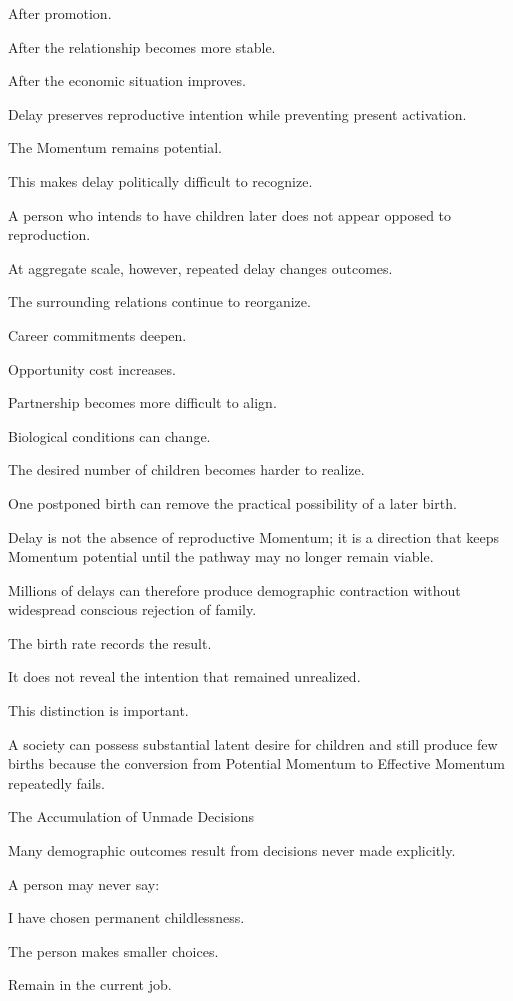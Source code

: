 After promotion.

After the relationship becomes more stable.

After the economic situation improves.

Delay preserves reproductive intention while preventing present activation.

The Momentum remains potential.

This makes delay politically difficult to recognize.

A person who intends to have children later does not appear opposed to reproduction.

At aggregate scale, however, repeated delay changes outcomes.

The surrounding relations continue to reorganize.

Career commitments deepen.

Opportunity cost increases.

Partnership becomes more difficult to align.

Biological conditions can change.

The desired number of children becomes harder to realize.

One postponed birth can remove the practical possibility of a later birth.

Delay is not the absence of reproductive Momentum; it is a direction that keeps Momentum potential until the pathway may no longer remain viable.

Millions of delays can therefore produce demographic contraction without widespread conscious rejection of family.

The birth rate records the result.

It does not reveal the intention that remained unrealized.

This distinction is important.

A society can possess substantial latent desire for children and still produce few births because the conversion from Potential Momentum to Effective Momentum repeatedly fails.

The Accumulation of Unmade Decisions

Many demographic outcomes result from decisions never made explicitly.

A person may never say:

I have chosen permanent childlessness.

The person makes smaller choices.

Remain in the current job.

